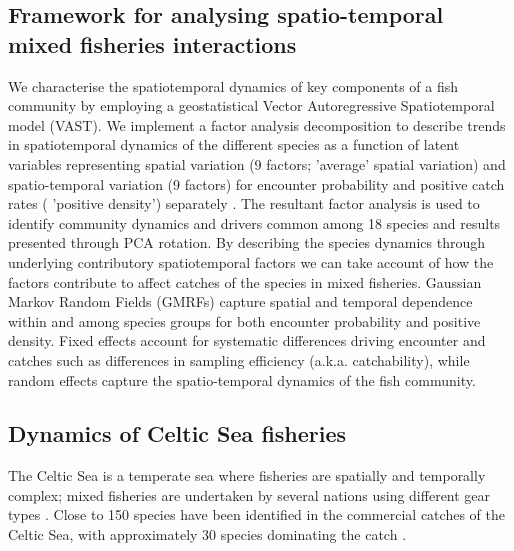 \documentclass{nature}
\begin{document}
\begin{linenumbers}
\subsection{Framework for analysing spatio-temporal mixed fisheries
	interactions}

 We  characterise
the spatiotemporal dynamics of key components of a fish community by employing
a geostatistical Vector Autoregressive Spatiotemporal model (VAST). We
implement a factor analysis decomposition to describe trends in spatiotemporal
dynamics of the different species as a function of latent variables
\cite{Thorson2015} representing spatial variation (9 factors;  'average' spatial variation) and spatio-temporal variation (9
factors) for encounter probability and positive catch rates ( 'positive density') separately \cite{Thorson2015a}.   The resultant factor analysis is used to identify community
dynamics and drivers common among 18 species and results presented
through  PCA rotation. By
describing the species dynamics through underlying contributory
spatiotemporal factors we can take account of how the factors contribute to
affect catches of the species in mixed fisheries.  Gaussian
Markov Random Fields (GMRFs)  capture spatial and temporal dependence
within and among species groups for both encounter probability and positive
density\cite{Thorson2013}.  Fixed effects  account for systematic differences driving
encounter and catches\deleted{,} such as differences in sampling efficiency (a.k.a.
catchability), while random effects capture the spatio-temporal dynamics of the
fish community.

\subsection{Dynamics of Celtic Sea fisheries}

The Celtic Sea is a temperate sea where fisheries are spatially and temporally
complex; mixed fisheries are undertaken by several nations using different gear
types \cite{Ellis2000, Gerritsen2012}. Close to 150 species have been
identified in the commercial catches of the Celtic Sea, with approximately 30
species dominating the catch \cite{Mateo2016}.


\end{linenumbers}
\end{document}
